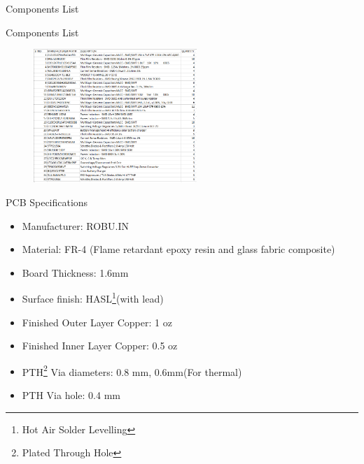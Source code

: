 \documentclass[aspectratio=169]{beamer}
\begin{document}
		\begin{section}{Components List}
			\begin{frame}{Components List}
				\begin{figure}[h]
					\centering
					\includegraphics[width=0.55\textwidth]{diag/compx.png}
				\end{figure}
			\end{frame}
		
				\begin{frame}{PCB Specifications}
			\begin{itemize}
				\item Manufacturer: ROBU.IN
				\item Material: FR-4 (Flame retardant epoxy resin and glass fabric composite)
				\item Board Thickness: 1.6mm
				\item Surface finish: HASL{\footnote{Hot Air Solder Levelling}}(with lead)
				\item Finished Outer Layer Copper: 1 oz
				\item Finished Inner Layer Copper: 0.5 oz
				\item PTH{\footnote{Plated Through Hole}} Via diameters: 0.8 mm, 0.6mm(For thermal)	
				\item PTH Via hole: 0.4 mm
			\end{itemize}
		\end{frame}
		
		\end{section}
			
				
		
\end{document}
